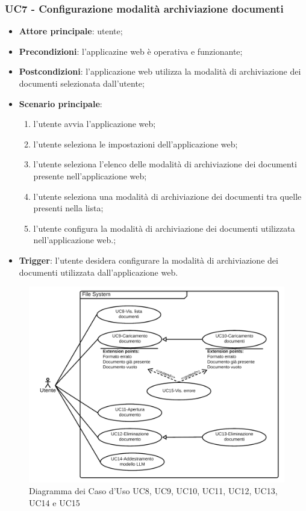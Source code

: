 \documentclass[10pt, a4paper]{article}
\begin{document}
    \subsubsection{UC7 - Configurazione modalità archiviazione documenti}
    \begin{itemize}
        \item \textbf{Attore principale}: utente;
        \item \textbf{Precondizioni}: l'applicazine web è operativa e funzionante;
        \item \textbf{Postcondizioni}: l'applicazione web utilizza la modalità di archiviazione dei documenti selezionata dall'utente;
        \item \textbf{Scenario principale}:
            \begin{enumerate}
                \item l'utente avvia l'applicazione web;
                \item l'utente seleziona le impostazioni dell'applicazione web;
                \item l'utente seleziona l'elenco delle modalità di archiviazione dei documenti presente nell'applicazione web;
                \item l'utente seleziona una modalità di archiviazione dei documenti tra quelle presenti nella lista;
                \item l'utente configura la modalità di archiviazione dei documenti utilizzata nell'applicazione web.;
            \end{enumerate}
        \item \textbf{Trigger}: l'utente desidera configurare la modalità di archiviazione dei documenti utilizzata dall'applicazione web.
    \end{itemize}

    \begin{figure}[h]
        \centering
        \includegraphics[width=\textwidth, height=\textheight, keepaspectratio]{UC-images/UC8-UC9-UC10-UC11-UC12-UC13-UC14-UC15.png}
        \caption{Diagramma dei Caso d'Uso UC8, UC9, UC10, UC11, UC12, UC13, UC14 e UC15}
    \end{figure}
\end{document}

